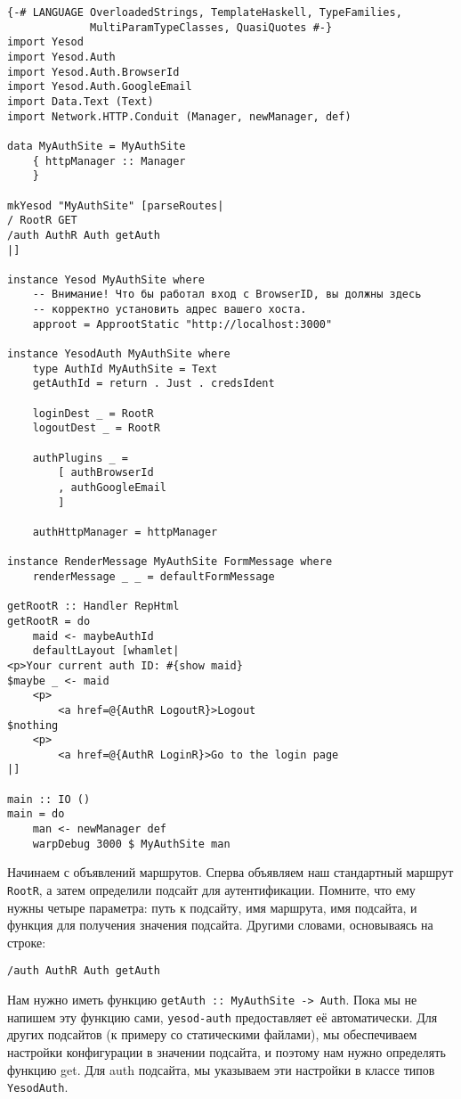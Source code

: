 \begin{lstlisting}
{-# LANGUAGE OverloadedStrings, TemplateHaskell, TypeFamilies,
             MultiParamTypeClasses, QuasiQuotes #-}
import Yesod
import Yesod.Auth
import Yesod.Auth.BrowserId
import Yesod.Auth.GoogleEmail
import Data.Text (Text)
import Network.HTTP.Conduit (Manager, newManager, def)

data MyAuthSite = MyAuthSite
    { httpManager :: Manager
    }

mkYesod "MyAuthSite" [parseRoutes|
/ RootR GET
/auth AuthR Auth getAuth
|]

instance Yesod MyAuthSite where
    -- Внимание! Что бы работал вход с BrowserID, вы должны здесь
    -- корректно установить адрес вашего хоста.
    approot = ApprootStatic "http://localhost:3000"

instance YesodAuth MyAuthSite where
    type AuthId MyAuthSite = Text
    getAuthId = return . Just . credsIdent

    loginDest _ = RootR
    logoutDest _ = RootR

    authPlugins _ =
        [ authBrowserId
        , authGoogleEmail
        ]

    authHttpManager = httpManager

instance RenderMessage MyAuthSite FormMessage where
    renderMessage _ _ = defaultFormMessage

getRootR :: Handler RepHtml
getRootR = do
    maid <- maybeAuthId
    defaultLayout [whamlet|
<p>Your current auth ID: #{show maid}
$maybe _ <- maid
    <p>
        <a href=@{AuthR LogoutR}>Logout
$nothing
    <p>
        <a href=@{AuthR LoginR}>Go to the login page
|]

main :: IO ()
main = do
    man <- newManager def
    warpDebug 3000 $ MyAuthSite man
\end{lstlisting}

Начинаем с объявлений маршрутов. Сперва объявляем наш стандартный маршрут \lstinline'RootR', а затем определили подсайт для аутентификации. Помните, что ему нужны четыре параметра: путь к подсайту, имя маршрута, имя подсайта, и функция для получения значения подсайта. Другими словами, основываясь на строке:

\begin{lstlisting}
/auth AuthR Auth getAuth
\end{lstlisting}

Нам нужно иметь функцию \lstinline'getAuth :: MyAuthSite -> Auth'. Пока мы не напишем эту функцию сами, \lstinline'yesod-auth' предоставляет её автоматически. Для других подсайтов (к примеру со статическими файлами), мы обеспечиваем настройки конфигурации в значении подсайта, и поэтому нам нужно определять функцию get. Для auth подсайта, мы указываем эти настройки в классе типов \lstinline'YesodAuth'.

